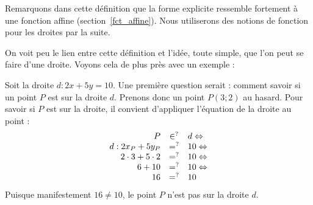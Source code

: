 Remarquons dans cette définition que la forme explicite ressemble fortement à une fonction affine (section~\ref{fct_affine}). Nous utiliserons des notions de fonction pour les droites par la suite.

On voit peu le lien entre cette définition et l'idée, toute simple, que l'on peut se faire d'une droite. Voyons cela de plus près avec un exemple :

\begin{exemple}
Soit la droite $d:2x+5y = 10$. Une première question serait : comment savoir si un point $P$ est sur la droite $d$. Prenons donc un point $P(3;2)$ au hasard. Pour savoir si $P$ est sur la droite, il convient d'appliquer l'équation de la droite au point :
$$
\begin{array}{rcl}
P &\in^?& d \Leftrightarrow \\
d:2x_P + 5y_P &=^?& 10\Leftrightarrow \\
2\cdot 3 + 5 \cdot 2 &=^?& 10 \Leftrightarrow \\
6 + 10 &=^?& 10 \Leftrightarrow \\
16 &=^?& 10
\end{array}
$$
Puisque manifestement $16\neq 10$, le point $P$ n'est pas sur la droite $d$.


\end{exemple}
